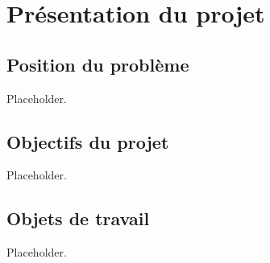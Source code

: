 \section{Présentation du projet}

\subsection{Position du problème}

Placeholder.

\subsection{Objectifs du projet}

Placeholder.

\subsection{Objets de travail}

Placeholder.